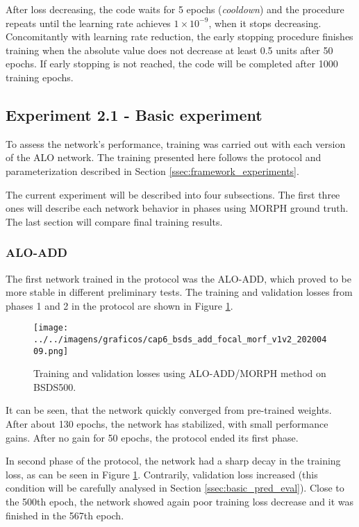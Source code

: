 After loss decreasing, the code waits for 5 epochs (\textit{cooldown}) and the procedure repeats until the learning rate achieves $1 \times 10^{-9}$, when it stops decreasing.
Concomitantly with learning rate reduction, the early stopping procedure finishes training when the absolute value does not decrease at least 0.5 units after 50 epochs.
If early stopping is not reached, the code will be completed after 1000 training epochs.

\subsection{Experiment 2.1 - Basic experiment}
\label{ssec:bsds_subexp1}

To assess the network's performance, training was carried out with each version of the ALO network.
The training presented here follows the protocol and parameterization described in Section \ref{ssec:framework_experiments}.

The current experiment will be described into four subsections.
The first three ones will describe each network behavior in phases using MORPH ground truth.
The last section will compare final training results.

\subsubsection{ALO-ADD}
\label{ssec:bsds_subexp1_add}

The first network trained in the protocol was the ALO-ADD, which proved to be more stable in different preliminary tests.
The training and validation losses from phases 1 and 2 in the protocol are shown in Figure \ref{fig:bsds_add_focal_morf_v1v2}.

\begin{figure}%
  \centering
  \caption{Training and validation losses using ALO-ADD/MORPH method on BSDS500.}
  \texttt{[image: ../../imagens/graficos/cap6\_bsds\_add\_focal\_morf\_v1v2\_20200409.png]}
  \sourceOwn
  \label{fig:bsds_add_focal_morf_v1v2}
\end{figure}

It can be seen, that the network quickly converged from pre-trained weights.
After about 130 epochs, the network has stabilized, with small performance gains.
After no gain for 50 epochs, the protocol ended its first phase.

In second phase of the protocol, the network had a sharp decay in the training loss, as can be seen in Figure \ref{fig:bsds_add_focal_morf_v1v2}.
Contrarily, validation loss increased (this condition will be carefully analysed in Section \ref{ssec:basic_pred_eval}).
Close to the 500th epoch, the network showed again poor training loss decrease and it was finished in the 567th epoch.

